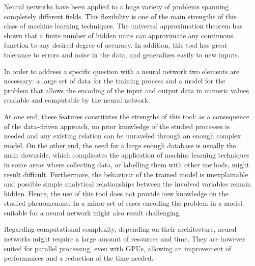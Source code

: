\documentclass[a4paper,10pt]{report}
\begin{document}
Neural networks have been applied to a huge variety of problems spanning completely different fields.
This flexibility is one of the main strengths of this class of machine learning techniques.
The universal approximation theorem has shown that 
a finite number of hidden units can approximate any continuous function to any desired degree of accuracy.
In addition, this tool has great tolerance to errors and noise in the data, and generalizes easily to
new inputs.

In order to address a specific question with a neural network two elements are necessary:
a large set of data for the training process and a model for the problem that allows
the encoding of the input and output data in numeric values readable and computable by the neural network.

At one end, these features constitutes the strengths of this tool:
as a consequence of the data-driven approach, no prior knowledge of
the studied processes is needed and any existing relation can be unraveled through
an enough complex model.
On the other end, the need for a large enough database is usually the main
downside, which complicates the application of machine learning techniques in some areas where
collecting data, or labelling them with other methods, might result difficult.
Furthermore, the behaviour of the trained model is unexplainable and 
possible simple analytical relationships between the involved variables remain hidden. 
Hence, the use of this tool does not provide new knowledge on the studied phenomenons.
In a minor set of cases encoding the problem in a model suitable for a neural network might also
result challenging.

Regarding computational complexity, depending on their architecture, neural networks might require a
large amount of resources and time. They are however suited for parallel processing, even with GPUs, allowing
an improvement of performances and a reduction of the time needed.
\end{document}
